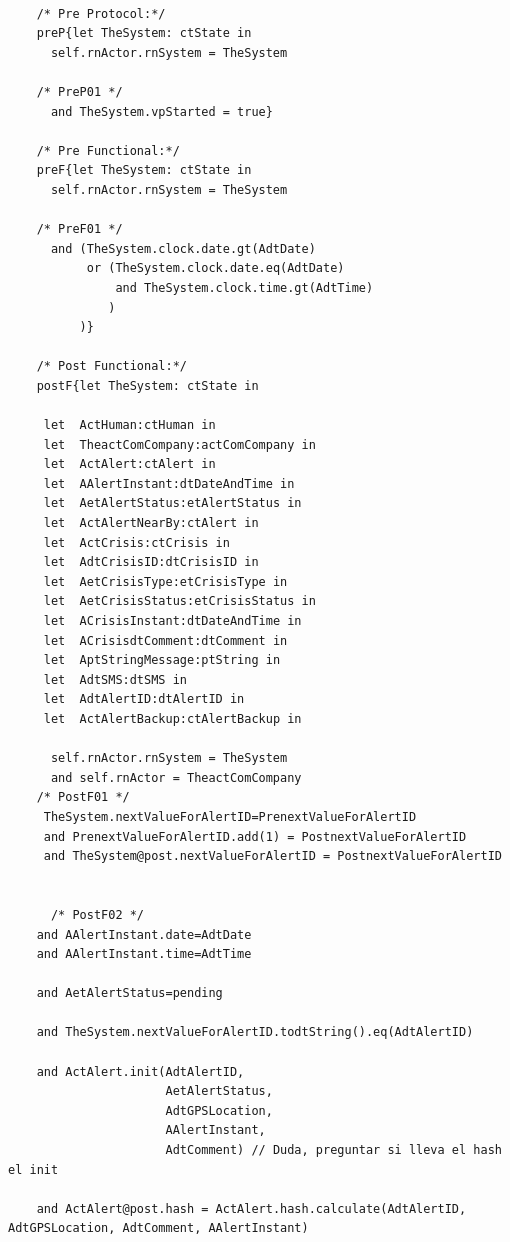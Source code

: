 	\scriptsize
	\vspace{0.5cm}
	\begin{lstlisting}[style=MessirStyle,firstnumber=auto,captionpos=b,caption={\msrmessir (MCL-oriented) specification of the operation \emph{oeAlert}.},label=OM-actComCompany-oeAlert-MCL-LST]

	/* Pre Protocol:*/ 
	preP{let TheSystem: ctState in
	  self.rnActor.rnSystem = TheSystem
	  
	/* PreP01 */
	  and TheSystem.vpStarted = true}
	
	/* Pre Functional:*/
	preF{let TheSystem: ctState in
	  self.rnActor.rnSystem = TheSystem
	
	/* PreF01 */
	  and (TheSystem.clock.date.gt(AdtDate)
	       or (TheSystem.clock.date.eq(AdtDate)
	           and TheSystem.clock.time.gt(AdtTime)
	          )
	      )}
	
	/* Post Functional:*/ 
	postF{let TheSystem: ctState in
	  
	 let  ActHuman:ctHuman in
	 let  TheactComCompany:actComCompany in
	 let  ActAlert:ctAlert in
	 let  AAlertInstant:dtDateAndTime in
	 let  AetAlertStatus:etAlertStatus in
	 let  ActAlertNearBy:ctAlert in
	 let  ActCrisis:ctCrisis in
	 let  AdtCrisisID:dtCrisisID in
	 let  AetCrisisType:etCrisisType in
	 let  AetCrisisStatus:etCrisisStatus in
	 let  ACrisisInstant:dtDateAndTime in
	 let  ACrisisdtComment:dtComment in
	 let  AptStringMessage:ptString in
	 let  AdtSMS:dtSMS in
	 let  AdtAlertID:dtAlertID in
	 let  ActAlertBackup:ctAlertBackup in
	 
	  self.rnActor.rnSystem = TheSystem
	  and self.rnActor = TheactComCompany
	/* PostF01 */
	 TheSystem.nextValueForAlertID=PrenextValueForAlertID
	 and PrenextValueForAlertID.add(1) = PostnextValueForAlertID
	 and TheSystem@post.nextValueForAlertID = PostnextValueForAlertID
	
	
	  /* PostF02 */
	and AAlertInstant.date=AdtDate
	and AAlertInstant.time=AdtTime
	
	and AetAlertStatus=pending
	        
	and TheSystem.nextValueForAlertID.todtString().eq(AdtAlertID)
	
	and ActAlert.init(AdtAlertID,
	                  AetAlertStatus,
	                  AdtGPSLocation,
	                  AAlertInstant,
	                  AdtComment) // Duda, preguntar si lleva el hash el init
	
	and ActAlert@post.hash = ActAlert.hash.calculate(AdtAlertID, AdtGPSLocation, AdtComment, AAlertInstant)
	      

\end{lstlisting}
